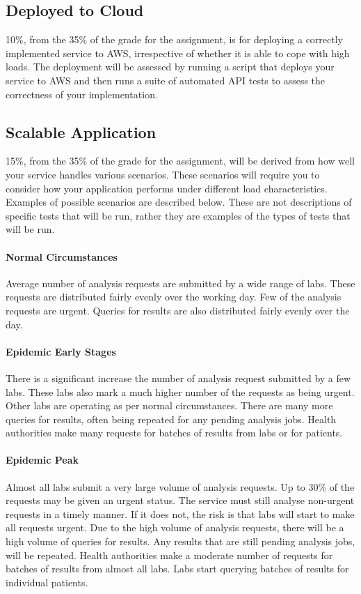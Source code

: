 \documentclass{csse4400}
\begin{document}
\subsection{Deployed to Cloud} %
10\%, from the 35\% of the grade for the assignment, is for deploying a correctly implemented service to AWS,
irrespective of whether it is able to cope with high loads.
The deployment will be assessed by running a script that deploys your service to AWS
and then runs a suite of automated API tests to assess the correctness of your implementation.

\subsection{Scalable Application}\label{sec:scenarios} %
15\%, from the 35\% of the grade for the assignment, will be derived from how well your service handles various scenarios.
These scenarios will require you to consider how your application performs under different load characteristics.
Examples of possible scenarios are described below.
These are not descriptions of specific tests that will be run,
rather they are examples of the types of tests that will be run.

\paragraph{Normal Circumstances}
Average number of analysis requests are submitted by a wide range of labs.
These requests are distributed fairly evenly over the working day.
Few of the analysis requests are urgent.
Queries for results are also distributed fairly evenly over the day.

\paragraph{Epidemic Early Stages}
There is a significant increase the number of analysis request submitted by a few labs.
These labs also mark a much higher number of the requests as being urgent.
Other labs are operating as per normal circumstances.
There are many more queries for results, often being repeated for any pending analysis jobs.
Health authorities make many requests for batches of results from labs or for patients.

\paragraph{Epidemic Peak}
Almost all labs submit a very large volume of analysis requests.
Up to 30\% of the requests may be given an urgent status.
The service must still analyse non-urgent requests in a timely manner.
If it does not, the risk is that labs will start to make all requests urgent.
Due to the high volume of analysis requests, there will be a high volume of queries for results.
Any results that are still pending analysis jobs, will be repeated.
Health authorities make a moderate number of requests for batches of results from almost all labs.
Labs start querying batches of results for individual patients.
\end{document}
